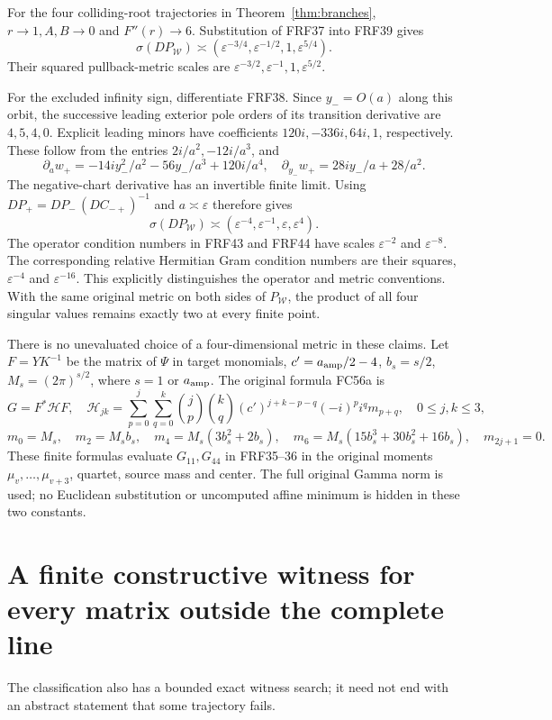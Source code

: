 \documentclass[11pt]{article}
\begin{document}
For the four colliding-root trajectories in Theorem~\ref{thm:branches},
$r\to1,A,B\to0$ and $F''(r)\to6$. Substitution of FRF37 into FRF39 gives
\[
 \boxed{\sigma(DP_{\mathcal W})\asymp
 (\varepsilon^{-3/4},\varepsilon^{-1/2},1,\varepsilon^{5/4}).}
 \tag{FRF43}
\]
Their squared pullback-metric scales are
$\varepsilon^{-3/2},\varepsilon^{-1},1,\varepsilon^{5/2}$.

For the excluded infinity sign, differentiate FRF38. Since $y_-=O(a)$
along this orbit, the successive leading exterior pole orders of its
transition derivative are $4,5,4,0$. Explicit leading minors have
coefficients $120i,-336i,64i,1$, respectively. These follow from the
entries $2i/a^2,-12i/a^3$, and
\[
 \partial_a w_+=-14iy_-^2/a^2-56y_-/a^3+120i/a^4,\quad
 \partial_{y_-}w_+=28iy_-/a+28/a^2.
\]
The negative-chart derivative has an invertible finite limit.
Using $DP_+=DP_-\,(D C_{-+})^{-1}$ and $a\asymp\varepsilon$ therefore gives
\[
 \boxed{\sigma(DP_{\mathcal W})\asymp
 (\varepsilon^{-4},\varepsilon^{-1},\varepsilon,\varepsilon^4).}
 \tag{FRF44}
\]
The operator condition numbers in FRF43 and FRF44 have scales
$\varepsilon^{-2}$ and $\varepsilon^{-8}$. The corresponding relative
Hermitian Gram condition numbers are their squares,
$\varepsilon^{-4}$ and $\varepsilon^{-16}$. This explicitly distinguishes
the operator and metric conventions. With the same original metric on
both sides of $P_{\mathcal W}$, the product of all four singular values
remains exactly two at every finite point.

There is no unevaluated choice of a four-dimensional metric in these
claims. Let $F=YK^{-1}$ be the matrix of $\Psi$ in target monomials,
$c'=a_{\rm amp}/2-4$, $b_s=s/2$, $M_s=(2\pi)^{s/2}$, where
$s=1$ or $a_{\rm amp}$. The original formula FC56a is
\[
 G=F^*\mathcal H F,\quad
 \mathcal H_{jk}=\sum_{p=0}^j\sum_{q=0}^k
 \binom jp\binom kq(c')^{j+k-p-q}(-i)^p i^q m_{p+q},
 \quad0\le j,k\le3,\tag{FRF45}
\]
\[
 m_0=M_s,\quad m_2=M_sb_s,\quad m_4=M_s(3b_s^2+2b_s),\quad
 m_6=M_s(15b_s^3+30b_s^2+16b_s),\quad m_{2j+1}=0.
\]
These finite formulas evaluate $G_{11},G_{44}$ in FRF35--36 in the original
moments $\mu_v,\ldots,\mu_{v+3}$, quartet, source mass and center.
The full original Gamma norm is used; no Euclidean substitution or
uncomputed affine minimum is hidden in these two constants.

\section{A finite constructive witness for every matrix outside the complete line}
The classification also has a bounded exact witness search; it need not
end with an abstract statement that some trajectory fails.
\end{document}

